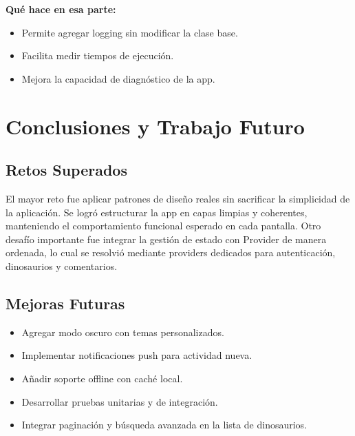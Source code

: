 \documentclass[12pt,a4paper]{article}
\begin{document}
\textbf{Qué hace en esa parte:}
\begin{itemize}
    \item Permite agregar logging sin modificar la clase base.
    \item Facilita medir tiempos de ejecución.
    \item Mejora la capacidad de diagnóstico de la app.
\end{itemize}

\section{Conclusiones y Trabajo Futuro}

\subsection{Retos Superados}
El mayor reto fue aplicar patrones de diseño reales sin sacrificar la simplicidad de la aplicación. Se logró estructurar la app en capas limpias y coherentes, manteniendo el comportamiento funcional esperado en cada pantalla. Otro desafío importante fue integrar la gestión de estado con Provider de manera ordenada, lo cual se resolvió mediante providers dedicados para autenticación, dinosaurios y comentarios.

\subsection{Mejoras Futuras}
\begin{itemize}
    \item Agregar modo oscuro con temas personalizados.
    \item Implementar notificaciones push para actividad nueva.
    \item Añadir soporte offline con caché local.
    \item Desarrollar pruebas unitarias y de integración.
    \item Integrar paginación y búsqueda avanzada en la lista de dinosaurios.
\end{itemize}
\end{document}
